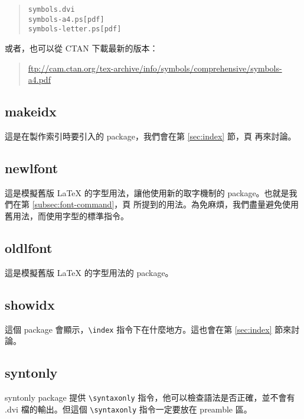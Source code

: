 \begin{quote}
  \begin{verbatim}
symbols.dvi
symbols-a4.ps[pdf]
symbols-letter.ps[pdf]
\end{verbatim}
\end{quote}

或者，也可以從 CTAN 下載最新的版本：

\begin{quote}
  \url{ftp://cam.ctan.org/tex-archive/info/symbols/comprehensive/symbols-a4.pdf}
\end{quote}

\subsection{makeidx}

這是在製作索引時要引入的 package，我們會在第 \ref{sec:index} 節，頁 \pageref{sec:index} 再來討論。

\subsection{newlfont}

這是模擬舊版 \LaTeX{} 的字型用法，讓他使用新的取字機制的 package。也就是我們在第 \ref{subsec:font-command}，頁 \pageref{subsec:font-command} 所提到的用法。為免麻煩，我們盡量避免使用舊用法，而使用字型的標準指令。

\subsection{oldlfont}

這是模擬舊版 \LaTeX{} 的字型用法的 package。

\subsection{showidx}

這個 package 會顯示，\verb|\index| 指令下在什麼地方。這也會在第 \ref{sec:index} 節來討論。

\subsection{syntonly}

\textsf{syntonly} package 提供 \verb|\syntaxonly| 指令，他可以檢查語法是否正確，並不會有 {\ttfamily *.dvi} 檔的輸出。但這個 \verb|\syntaxonly| 指令一定要放在 preamble 區。

